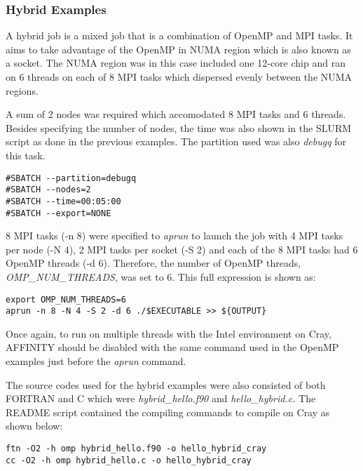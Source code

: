 \subsubsection{Hybrid Examples}

A hybrid job is a mixed job that is a combination of OpenMP and MPI tasks. It aims to take advantage of the OpenMP in NUMA region which is also known as 
a socket. The NUMA region was in this case included one 12-core chip and ran on 6 threads on each of 8 MPI tasks which dispersed evenly between 
the NUMA regions.

A sum of 2 nodes was required which accomodated 8 MPI tasks and 6 threads. Besides specifying the number of nodes, the time was also shown in the SLURM 
script as done in the previous examples. The partition used was also \emph{debugq} for this task.

\begin{tcolorbox}
\begin{Verbatim}[fontsize=\scriptsize]
#SBATCH --partition=debugq
#SBATCH --nodes=2
#SBATCH --time=00:05:00
#SBATCH --export=NONE
\end{Verbatim}
\end{tcolorbox}


8 MPI tasks (-n 8) were specified to \emph{aprun} to launch the job with 4 MPI tasks per node (-N 4), 2 MPI tasks per socket (-S 2) and each of the 8 MPI tasks 
had 6 OpenMP threads (-d 6). Therefore, the number of OpenMP threads, \emph{OMP\_NUM\_THREADS}, was set to 6. This full expression is shown as:

\begin{tcolorbox}
\begin{Verbatim}[fontsize=\scriptsize]
export OMP_NUM_THREADS=6
aprun -n 8 -N 4 -S 2 -d 6 ./$EXECUTABLE >> ${OUTPUT}
\end{Verbatim}
\end{tcolorbox}

Once again, to run on multiple threads with the Intel environment on Cray, AFFINITY should be disabled with the same command used in the OpenMP examples
just before the \emph{aprun} command.

The source codes used for the hybrid examples were also consisted of both FORTRAN and C which were \emph{hybrid\_hello.f90} and \emph{hello\_hybrid.c.} 
The README script contained the compiling commands to compile on Cray as shown below:

\begin{tcolorbox}
\begin{Verbatim}[fontsize=\scriptsize]
ftn -O2 -h omp hybrid_hello.f90 -o hello_hybrid_cray
cc -O2 -h omp hybrid_hello.c -o hello_hybrid_cray
\end{Verbatim}
\end{tcolorbox}

